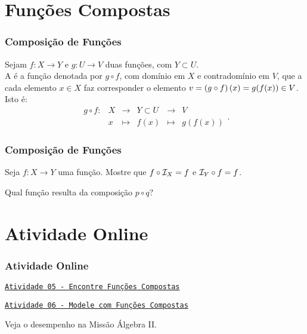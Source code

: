 \documentclass[brazil, notheorems, 10pt]{beamer}
\begin{document}
\section{Funções Compostas}
\begin{frame}
\frametitle{Composição de Funções} %

\begin{Def}
Sejam $f: X \to Y$ e $g: U \to V$ duas funções, com $Y \subset U$.\\
A  é a função denotada por $g
\circ f$, com domínio em $X$ e contradomínio em $V$, que a cada
elemento $x \in X$ faz corresponder o elemento $v = \left(g \circ
f\right)(x) = g(f(x)) \in V$. Isto é:
$$\begin{array}{cccccc}
g \circ f : & X & \to     & Y \subset U & \to & V \\
		 &  x & \mapsto & f(x) & \mapsto & g(f(x))
\end{array}.$$
\end{Def}

\end{frame}


\begin{frame}
\frametitle{Composição de Funções} %

\begin{Exem}
Seja $f: X \to Y$ uma função. Mostre que $f \circ \mathcal I_X = f$ e $\mathcal I_Y
\circ f = f$.
\end{Exem}\pause

\begin{Exem}
Qual função resulta da composição $p \circ q$?
\end{Exem}
\end{frame}

\section{Atividade Online}
\begin{frame}
\frametitle{Atividade Online} %

\href{https://pt.khanacademy.org/math/algebra2/manipulating-functions/function-composition/e/compose-functions}
{{\tt Atividade 05 - Encontre Funções Compostas}}

\href{https://pt.khanacademy.org/math/algebra2/manipulating-functions/combining-and-composing-modeling-functions/e/modeling-with-composite-functions}
{{\tt Atividade 06 - Modele com Funções Compostas}}


Veja o desempenho na Missão Álgebra II.


\end{frame}
\end{document}
